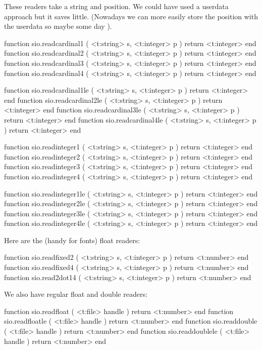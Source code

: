 \stopsubsection

\startsubsection[title=Reading from a string]

These readers take a string and position. We could have used a userdata approach
but it saves little. (Nowadays we can more easily store the position with the
userdata so maybe some day \unknown).

\starttyping[option=LUA]
function sio.readcardinal1 ( <t:string> s, <t:integer> p ) return <t:integer> end
function sio.readcardinal2 ( <t:string> s, <t:integer> p ) return <t:integer> end
function sio.readcardinal3 ( <t:string> s, <t:integer> p ) return <t:integer> end
function sio.readcardinal4 ( <t:string> s, <t:integer> p ) return <t:integer> end

function sio.readcardinal1le ( <t:string> s, <t:integer> p ) return <t:integer> end
function sio.readcardinal2le ( <t:string> s, <t:integer> p ) return <t:integer> end
function sio.readcardinal3le ( <t:string> s, <t:integer> p ) return <t:integer> end
function sio.readcardinal4le ( <t:string> s, <t:integer> p ) return <t:integer> end

function sio.readinteger1 ( <t:string> s, <t:integer> p ) return <t:integer> end
function sio.readinteger2 ( <t:string> s, <t:integer> p ) return <t:integer> end
function sio.readinteger3 ( <t:string> s, <t:integer> p ) return <t:integer> end
function sio.readinteger4 ( <t:string> s, <t:integer> p ) return <t:integer> end

function sio.readinteger1le ( <t:string> s, <t:integer> p ) return <t:integer> end
function sio.readinteger2le ( <t:string> s, <t:integer> p ) return <t:integer> end
function sio.readinteger3le ( <t:string> s, <t:integer> p ) return <t:integer> end
function sio.readinteger4le ( <t:string> s, <t:integer> p ) return <t:integer> end
\stoptyping

Here are the (handy for fonts) float readers:

\starttyping[option=LUA]
function sio.readfixed2 ( <t:string> s, <t:integer> p ) return <t:number> end
function sio.readfixed4 ( <t:string> s, <t:integer> p ) return <t:number> end
function sio.read2dot14 ( <t:string> s, <t:integer> p ) return <t:number> end
\stoptyping

We also have regular float and double readers:

\starttyping[option=LUA]
function sio.readfloat    ( <t:file> handle ) return <t:number>  end
function sio.readfloatle  ( <t:file> handle ) return <t:number>  end
function sio.readdouble   ( <t:file> handle ) return <t:number>  end
function sio.readdoublele ( <t:file> handle ) return <t:number>  end
\stoptyping

